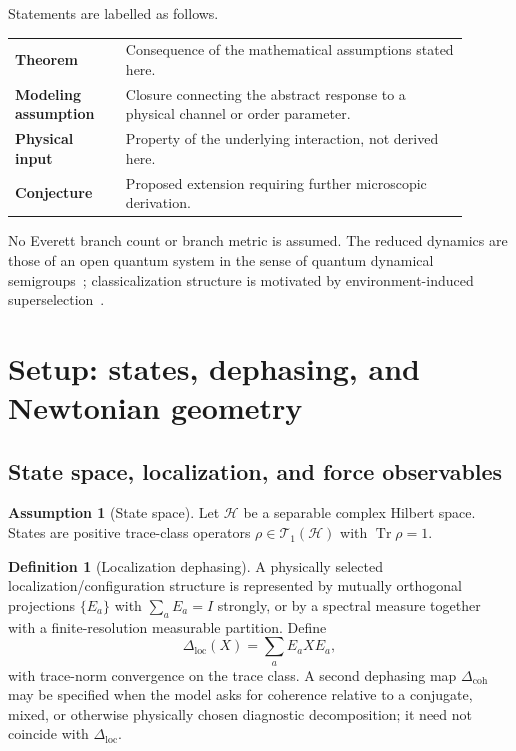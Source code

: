 \documentclass[11pt]{article}
\theoremstyle{definition}
\newtheorem{definition}[theorem]{Definition}
\newtheorem{assumption}[theorem]{Assumption}
\theoremstyle{remark}
\newcommand{\Tr}{\operatorname{Tr}}
\begin{document}
Statements are labelled as follows.
\begin{center}
\begin{tabular}{>{\bfseries}p{0.22\linewidth}p{0.68\linewidth}}
Theorem & Consequence of the mathematical assumptions stated here.\\
Modeling assumption & Closure connecting the abstract response to a physical channel or order parameter.\\
Physical input & Property of the underlying interaction, not derived here.\\
Conjecture & Proposed extension requiring further microscopic derivation.\\
\end{tabular}
\end{center}
No Everett branch count or branch metric is assumed.
The reduced dynamics are those of an open quantum system in the sense of quantum dynamical semigroups~\cite{lindblad1976,gks1976,breuerPetruccione2002}; classicalization structure is motivated by environment-induced superselection~\cite{zurek1982,schlosshauer2007}.

\section{Setup: states, dephasing, and Newtonian geometry}
\subsection{State space, localization, and force observables}

\begin{assumption}[State space]
Let $\mathcal H$ be a separable complex Hilbert space.
States are positive trace-class operators $\rho\in\mathcal T_1(\mathcal H)$ with $\Tr\rho=1$.
\end{assumption}

\begin{definition}[Localization dephasing]
A physically selected localization/configuration structure is represented by mutually orthogonal projections $\{E_a\}$ with $\sum_a E_a=I$ strongly, or by a spectral measure together with a finite-resolution measurable partition.
Define
\begin{equation}
  \Delta_{\mathrm{loc}}(X)=\sum_a E_a X E_a,
\end{equation}
with trace-norm convergence on the trace class.
A second dephasing map $\Delta_{\mathrm{coh}}$ may be specified when the model asks for coherence relative to a conjugate, mixed, or otherwise physically chosen diagnostic decomposition; it need not coincide with $\Delta_{\mathrm{loc}}$.
\end{definition}
\end{document}
